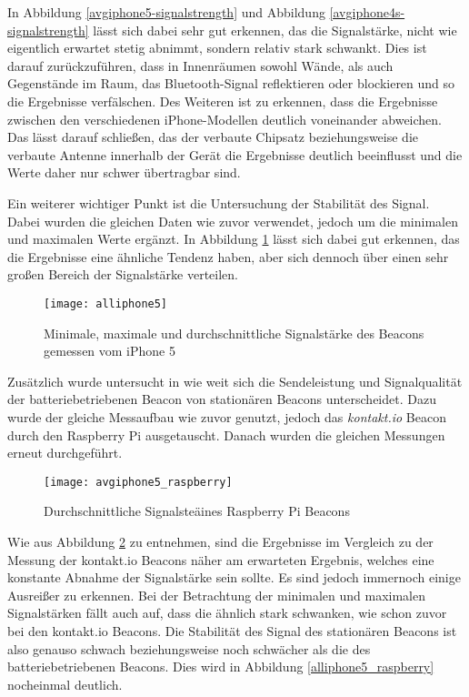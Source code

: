 In Abbildung \ref{avgiphone5-signalstrength} und Abbildung \ref{avgiphone4s-signalstrength} lässt sich dabei sehr gut erkennen, das die Signalstärke, nicht wie eigentlich erwartet stetig abnimmt, sondern relativ stark schwankt. Dies ist darauf zurückzuführen, dass in Innenräumen sowohl Wände, als auch Gegenstände im Raum, das Bluetooth-Signal reflektieren oder blockieren und so die Ergebnisse verfälschen.
Des Weiteren ist zu erkennen, dass die Ergebnisse zwischen den verschiedenen iPhone-Modellen deutlich voneinander abweichen. Das lässt darauf schließen, das der verbaute Chipsatz beziehungsweise die verbaute Antenne innerhalb der Gerät die Ergebnisse deutlich beeinflusst und die Werte daher nur schwer übertragbar sind.

Ein weiterer wichtiger Punkt ist die Untersuchung der Stabilität des Signal. Dabei wurden die gleichen Daten wie zuvor verwendet, jedoch um die minimalen und maximalen Werte ergänzt. In Abbildung \ref{all-iphone5} lässt sich dabei gut erkennen, das die Ergebnisse eine ähnliche Tendenz haben, aber sich dennoch über einen sehr großen Bereich der Signalstärke verteilen.

\begin{figure}[htb!]
		\centering
	\texttt{[image: alliphone5]}
	\caption{Minimale, maximale und durchschnittliche Signalstärke des Beacons gemessen vom iPhone 5}
	\label{all-iphone5}
\end{figure}


Zusätzlich wurde untersucht in wie weit sich die Sendeleistung und Signalqualität der batteriebetriebenen Beacon von stationären Beacons unterscheidet.
Dazu wurde der gleiche Messaufbau wie zuvor genutzt, jedoch das \emph{kontakt.io} Beacon durch den Raspberry Pi ausgetauscht. Danach wurden die gleichen Messungen erneut durchgeführt.

\begin{figure}[htb!]
		\centering
	\texttt{[image: avgiphone5\_raspberry]}
	\caption{Durchschnittliche Signalsteäines Raspberry Pi Beacons}
		\label{avgiphone5_raspberry}
\end{figure}

Wie aus Abbildung \ref{avgiphone5_raspberry} zu entnehmen, sind die Ergebnisse im Vergleich zu der Messung der kontakt.io Beacons näher am erwarteten Ergebnis, welches eine konstante Abnahme der Signalstärke sein sollte. Es sind jedoch immernoch einige Ausreißer zu erkennen. Bei der Betrachtung der minimalen und maximalen Signalstärken fällt auch auf, dass die ähnlich stark schwanken, wie schon zuvor bei den kontakt.io Beacons. Die Stabilität des Signal des stationären Beacons ist also genauso schwach beziehungsweise noch schwächer als die des batteriebetriebenen Beacons. Dies wird in Abbildung \ref{alliphone5_raspberry} nocheinmal deutlich.


